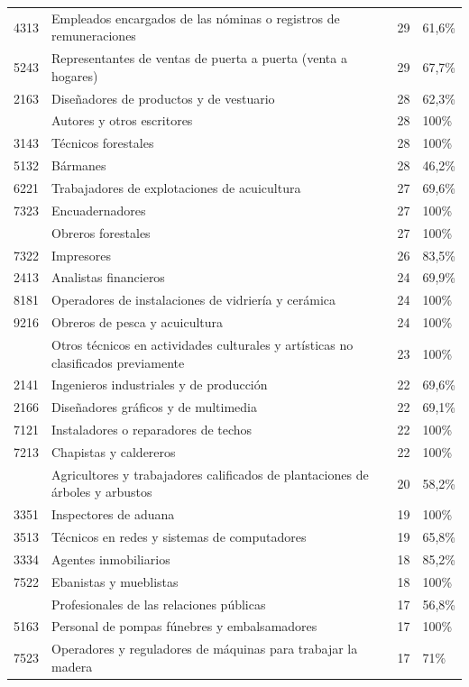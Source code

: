 \documentclass[
  11pt,
]{article}
\begin{document}
\begin{longtable}{r>{\raggedright\arraybackslash}p{9cm}rl}
4313 & Empleados encargados de las nóminas o registros de remuneraciones & 29 & 61,6\%\\
5243 & Representantes de ventas de puerta a puerta (venta a hogares) & 29 & 67,7\%\\
2163 & Diseñadores de productos y de vestuario & 28 & 62,3\%\\
\addlinespace
2641 & Autores y otros escritores & 28 & 100\%\\
3143 & Técnicos forestales & 28 & 100\%\\
5132 & Bármanes & 28 & 46,2\%\\
6221 & Trabajadores de explotaciones de acuicultura & 27 & 69,6\%\\
7323 & Encuadernadores & 27 & 100\%\\
\addlinespace
9215 & Obreros forestales & 27 & 100\%\\
7322 & Impresores & 26 & 83,5\%\\
2413 & Analistas financieros & 24 & 69,9\%\\
8181 & Operadores de instalaciones de vidriería y cerámica & 24 & 100\%\\
9216 & Obreros de pesca y acuicultura & 24 & 100\%\\
\addlinespace
3439 & Otros técnicos en actividades culturales y artísticas no clasificados previamente & 23 & 100\%\\
2141 & Ingenieros industriales y de producción & 22 & 69,6\%\\
2166 & Diseñadores gráficos y de multimedia & 22 & 69,1\%\\
7121 & Instaladores o reparadores de techos & 22 & 100\%\\
7213 & Chapistas y caldereros & 22 & 100\%\\
\addlinespace
6112 & Agricultores y trabajadores calificados de plantaciones de árboles y arbustos & 20 & 58,2\%\\
3351 & Inspectores de aduana & 19 & 100\%\\
3513 & Técnicos en redes y sistemas de computadores & 19 & 65,8\%\\
3334 & Agentes inmobiliarios & 18 & 85,2\%\\
7522 & Ebanistas y mueblistas & 18 & 100\%\\
\addlinespace
2432 & Profesionales de las relaciones públicas & 17 & 56,8\%\\
5163 & Personal de pompas fúnebres y embalsamadores & 17 & 100\%\\
7523 & Operadores y reguladores de máquinas para trabajar la madera & 17 & 71\%\\

\end{longtable}
\end{document}
